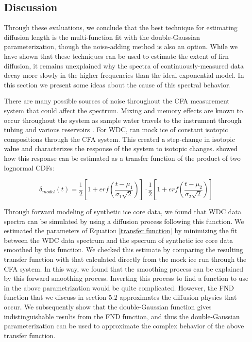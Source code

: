 \documentclass[draft, jgrga]{AGUTeX}
\begin{document}
\begin{article}

\section{Discussion}


Through these evaluations, we conclude that the best technique for estimating diffusion length is the multi-function fit with the double-Gaussian parameterization, though the noise-adding method is also an option. While we have shown that these techniques can be used to estimate the extent of firn diffusion, it remains unexplained why the spectra of continuously-measured data decay more slowly in the higher frequencies than the ideal exponential model. In this section we present some ideas about the cause of this spectral behavior.

There are many possible sources of noise throughout the CFA measurement system that could affect the spectrum. Mixing and memory effects are known to occur throughout the system as sample water travels to the instrument through tubing and various reservoirs \citep{Gkinis2011a}. For WDC, \citet{Jones2017b} ran mock ice of constant isotopic compositions through the CFA system. This created a step-change in isotopic value and characterizes the response of the system to isotopic changes. \citep{Jones2017b} showed how this response can be estimated as a transfer function of the product of two lognormal CDFs:

\begin{equation}
  \label{transfer function}
  \delta_{model}(t) = \frac{1}{2}\left[1+erf\left(\frac{t-\mu_1}{\sigma_1\sqrt{2}}\right)\right] \cdot \frac{1}{2}\left[1+erf\left(\frac{t-\mu_2}{\sigma_2\sqrt{2}}\right)\right]
\end{equation}

Through forward modeling of synthetic ice core data, we found that WDC data spectra can be simulated by using a diffusion process following this function. We estimated the parameters of Equation \ref{transfer function} by minimizing the fit between the WDC data spectrum and the specrum of synthetic ice core data smoothed by this function. We checked this estimate by comparing the resulting transfer function with that calculated directly from the mock ice run through the CFA system. In this way, we found that the smoothing process can be explained by this forward smoothing process. Inverting this process to find a function to use in the above parametrization would be quite complicated. However, the FND function that we discuss in section 5.2 approximates the diffusion physics that occur. We subsequently show that the double-Gaussian function gives indistinguishable results from the FND function, and thus the double-Gaussian parameterization can be used to approximate the complex behavior of the above transfer function.


\end{article}
\end{document}
